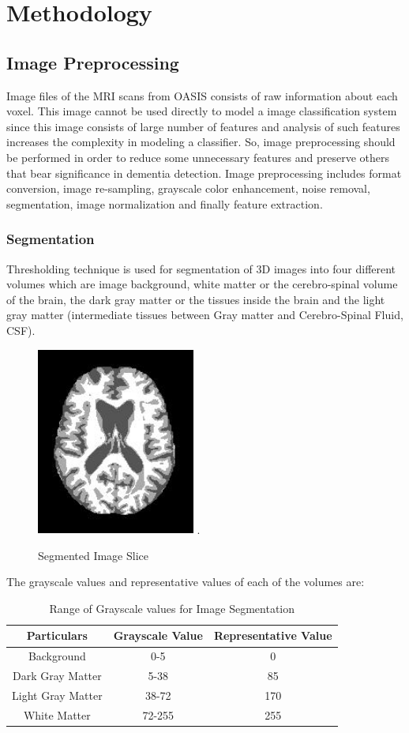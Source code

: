 \documentclass[journal,twoside]{IEEEtran}
\begin{document}
\section{Methodology}
\subsection{Image Preprocessing}
Image files of the MRI scans from OASIS consists of raw information about each voxel. This image cannot be used directly to model a image classification system since this image consists of large number of features and analysis of such features increases the complexity in modeling a classifier. So, image preprocessing should be performed in order to reduce some unnecessary features and preserve others that bear significance in dementia detection. Image preprocessing includes format conversion, image re-sampling, grayscale color enhancement, noise removal, segmentation, image normalization and finally feature extraction.\newline
\subsubsection{Segmentation}
Thresholding technique is used for segmentation of 3D images into four different volumes which are image background, white matter or the cerebro-spinal volume of the brain, the dark gray matter or the tissues inside the brain and the light gray matter (intermediate tissues between Gray matter and Cerebro-Spinal Fluid, CSF).
\begin{figure}[h]
\centering
\includegraphics[width=2.05in]{9.jpg}
\DeclareGraphicsExtensions.
\caption{Segmented Image Slice}
\end{figure}
\newline The grayscale values and representative values of each of the volumes are:
\begin{table}[h]
\centering
\begin{tabular}{|c|c|c|}
	\hline
	Particulars & Grayscale Value & Representative Value\\
	\hline
	Background & 0-5 & 0\\
	Dark Gray Matter &  5-38 & 85\\
	Light Gray Matter  & 38-72 & 170\\
	White Matter & 72-255 & 255\\
	\hline
\end{tabular}
\caption{Range of Grayscale values for Image Segmentation}
\end{table}
\newline
\end{document}
